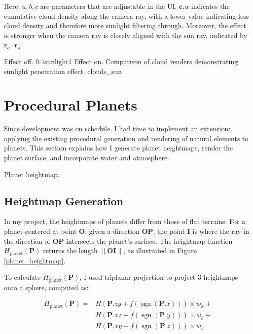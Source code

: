 Here, $a,b,c$ are parameters that are adjustable in the UI. $\mathbf{c}.\alpha$ indicates the cumulative cloud density along the camera ray, with a lower value indicating less cloud density and therefore more sunlight filtering through. Moreover, the effect is stronger when the camera ray is closely aligned with the sun ray, indicated by $\mathbf{r_c}\cdot \mathbf{r_s}$.


{Effect off.}
{0.4}{sunlight1}
{Effect on.}
{Comparison of cloud renders demonstrating sunlight penetration effect.}
{clouds_sun}

\section{Procedural Planets}

Since development was on schedule, I had time to implement an extension: applying the existing procedural generation and rendering of natural elements to planets. This section explains how I generate planet heightmaps, render the planet surface, and incorporate water and atmosphere.


\vspace{\baselineskip}
{Planet heightmap.}{
\subsection{Heightmap Generation}
\vspace{\baselineskip}
In my project, the heightmaps of planets differ from those of flat terrains. For a planet centered at point $\mathbf{O}$, given a direction $\mathbf{OP}$, the point $\mathbf{I}$ is where the ray in the direction of $\mathbf{OP}$ intersects the planet's surface. The heightmap function $H_{\text{planet}} (\mathbf{P})$ returns the length $\|\mathbf{OI}\|$, as illustrated in Figure \ref{planet_heightmap}.
}

To calculate $H_\text{planet} (\mathbf{P})$, I used triplanar projection \cite{flick_triplanar_nodate} to project 3 heightmaps onto a sphere, computed as:

\begin{equation}
\begin{aligned}
H_\text{planet} (\mathbf{P}) = 
&H(\mathbf{P}.zy + f(\operatorname{sgn}(\mathbf{P}.x))) \times w_{x}+ \\
&H(\mathbf{P}.xz + f(\operatorname{sgn}(\mathbf{P}.y))) \times w_{y}+ \\
&H(\mathbf{P}.xy + f(\operatorname{sgn}(\mathbf{P}.z))) \times w_{z}
\end{aligned}
\end{equation}


